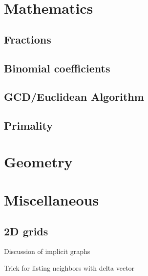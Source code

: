 \documentclass[10pt]{article}
\begin{document}
\section{Mathematics}

\subsection{Fractions}

\subsection{Binomial coefficients}

\subsection{GCD/Euclidean Algorithm}

\subsection{Primality}

\section{Geometry}

\section{Miscellaneous}

\subsection{2D grids}

Discussion of implicit graphs

Trick for listing neighbors with delta vector
\end{document}

